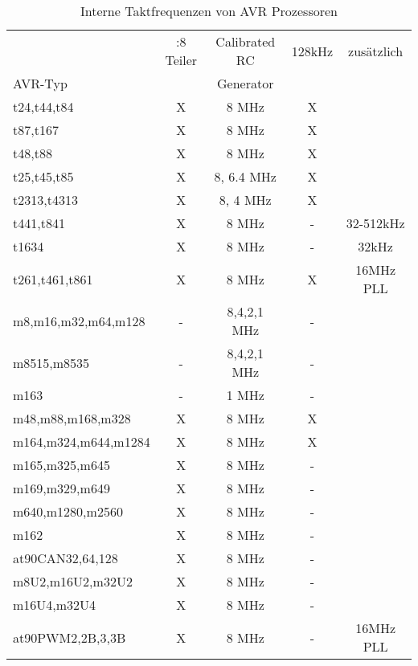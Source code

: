 \begin{table}[H]
  \begin{center}
    \begin{tabular}{| l || c | c | c | c |}
    \hline
                      & :8 Teiler & Calibrated RC & 128kHz & zusätzlich \\
  AVR-Typ             &           & Generator     &        & \\
    \hline
    \hline
 t24,t44,t84          &  X        & 8 MHz         & X      &   \\
 t87,t167             &  X        & 8 MHz         & X      & \\
 t48,t88              &  X        & 8 MHz         & X      & \\
    \hline
 t25,t45,t85          &  X        & 8, 6.4 MHz    & X      & \\
    \hline
 t2313,t4313          &  X        & 8, 4 MHz      & X      &  \\
    \hline
 t441,t841            &  X        & 8 MHz         & -      & 32-512kHz \\
    \hline
 t1634                &  X        & 8 MHz         & -      & 32kHz \\
    \hline
 t261,t461,t861       &  X        & 8 MHz         & X      & 16MHz PLL \\
    \hline
 m8,m16,m32,m64,m128  &  -        & 8,4,2,1 MHz   & -      & \\
 m8515,m8535          &  -        & 8,4,2,1 MHz   & -      & \\
    \hline
 m163                 &  -        & 1 MHz         & -      &  \\
    \hline
 m48,m88,m168,m328    &  X        & 8 MHz         & X      & \\
 m164,m324,m644,m1284 & X         & 8 MHz         & X      & \\
    \hline
 m165,m325,m645       &  X        & 8 MHz         & -      & \\
 m169,m329,m649       &  X        & 8 MHz         & -      & \\
 m640,m1280,m2560     &  X        & 8 MHz         & -      & \\
 m162                 &  X        & 8 MHz         & -      & \\
 at90CAN32,64,128     &  X        & 8 MHz         & -      & \\
 m8U2,m16U2,m32U2     &  X        & 8 MHz         & -      & \\
 m16U4,m32U4          &  X        & 8 MHz         & -      & \\
    \hline
 at90PWM2,2B,3,3B     &  X        & 8 MHz         & -      & 16MHz PLL \\
    \hline
    \end{tabular}
  \end{center}
  \caption{Interne Taktfrequenzen von AVR Prozessoren}
  \label{tab:clockInt}
\end{table}
